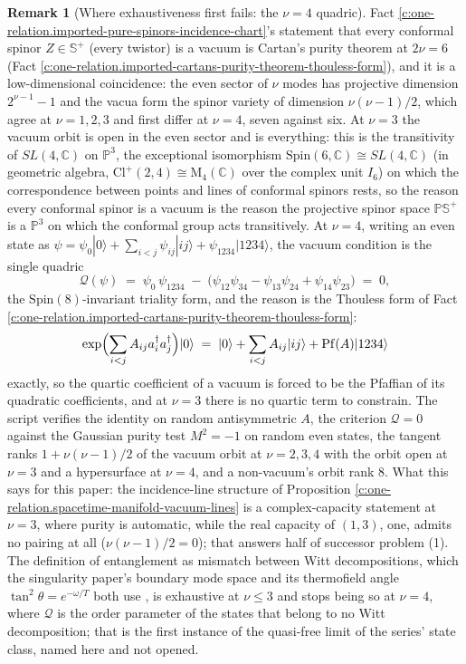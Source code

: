 \documentclass[11pt]{article}
\theoremstyle{definition}
\newtheorem{remark}[theorem]{Remark}
\theoremstyle{plain}
\newcommand{\changedmark}[2]{\marginpar{\raggedright\scriptsize\color{#1}#2}}
\providecommand{\C}{}\renewcommand{\C}{\mathbb{C}}
\providecommand{\CS}{}\renewcommand{\CS}{{\mathbb{S}^{+}}}
\providecommand{\Cl}{}\renewcommand{\Cl}{\mathrm{Cl}}
\providecommand{\Mat}{}\renewcommand{\Mat}{\mathrm{M}}
\providecommand{\PCS}{}\renewcommand{\PCS}{\mathbb{P}{\mathbb{S}^{+}}}
\begin{document}
\begin{remark}[Where exhaustiveness first fails: the $\nu = 4$ quadric]\label{c:note.one-relation.where-exhaustiveness-first-fails-4-quadric}
\changedmark{gray}{reworded}
Fact \ref{c:one-relation.imported-pure-spinors-incidence-chart}'s statement that every conformal spinor $Z \in \CS$ (every twistor) is a vacuum is Cartan's purity theorem at $2\nu = 6$ (Fact \ref{c:one-relation.imported-cartans-purity-theorem-thouless-form}), and it is a low-dimensional coincidence: the even sector of $\nu$ modes has projective dimension $2^{\nu - 1} - 1$ and the vacua form the spinor variety of dimension $\nu(\nu - 1)/2$, which agree at $\nu = 1, 2, 3$ and first differ at $\nu = 4$, seven against six. At $\nu = 3$ the vacuum orbit is open in the even sector and is everything: this is the transitivity of $SL(4, \C)$ on $\mathbb{P}^{3}$, the exceptional isomorphism $\mathrm{Spin}(6, \C) \cong SL(4, \C)$ (in geometric algebra, $\Cl^+(2,4) \cong \Mat_4(\C)$ over the complex unit $I_6$) on which the correspondence between points and lines of conformal spinors rests, so the reason every conformal spinor is a vacuum is the reason the projective spinor space $\PCS$ is a $\mathbb{P}^{3}$ on which the conformal group acts transitively. At $\nu = 4$, writing an even state as $\psi = \psi_{0}|0\rangle + \sum_{i<j}\psi_{ij}|ij\rangle + \psi_{1234}|1234\rangle$, the vacuum condition is the single quadric
\[
\mathcal{Q}(\psi) \;=\; \psi_{0}\,\psi_{1234} \;-\; \bigl(\psi_{12}\psi_{34} - \psi_{13}\psi_{24} + \psi_{14}\psi_{23}\bigr) \;=\; 0 ,
\]
the $\mathrm{Spin}(8)$-invariant triality form, and the reason is the Thouless form of Fact \ref{c:one-relation.imported-cartans-purity-theorem-thouless-form}:
\[
\exp\Bigl(\sum_{i<j} A_{ij}a^{\dagger}_{i}a^{\dagger}_{j}\Bigr)|0\rangle \;=\; |0\rangle + \sum_{i<j} A_{ij}|ij\rangle + \mathrm{Pf}(A)|1234\rangle
\]
exactly, so the quartic coefficient of a vacuum is forced to be the Pfaffian of its quadratic coefficients, and at $\nu = 3$ there is no quartic term to constrain. The script verifies the identity on random antisymmetric $A$, the criterion $\mathcal{Q} = 0$ against the Gaussian purity test $M^{2} = -1$ on random even states, the tangent ranks $1 + \nu(\nu - 1)/2$ of the vacuum orbit at $\nu = 2, 3, 4$ with the orbit open at $\nu = 3$ and a hypersurface at $\nu = 4$, and a non-vacuum's orbit rank $8$. What this says for this paper: the incidence-line structure of Proposition \ref{c:one-relation.spacetime-manifold-vacuum-lines} is a complex-capacity statement at $\nu = 3$, where purity is automatic, while the real capacity of $(1,3)$, one, admits no pairing at all ($\nu(\nu - 1)/2 = 0$); that answers half of successor problem (1). The definition of entanglement as mismatch between Witt decompositions, which the singularity paper's boundary mode space and its thermofield angle $\tan^{2}\theta = e^{-\omega/T}$ both use \cite[Lem.~7.2, Thm.~7.3]{ButlerT5}, is exhaustive at $\nu \leq 3$ and stops being so at $\nu = 4$, where $\mathcal{Q}$ is the order parameter of the states that belong to no Witt decomposition; that is the first instance of the quasi-free limit of the series' state class, named here and not opened.
\end{remark}
\end{document}
